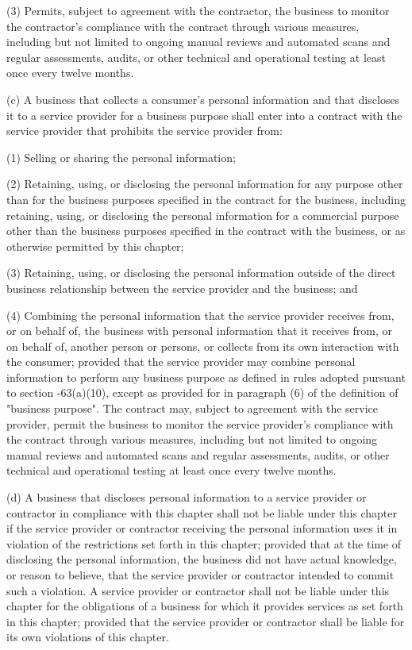      (3)  Permits, subject to agreement with the contractor, the business to monitor the contractor's compliance with the contract through various measures, including but not limited to ongoing manual reviews and automated scans and regular assessments, audits, or other technical and operational testing at least once every twelve months.

     (c)  A business that collects a consumer's personal information and that discloses it to a service provider for a business purpose shall enter into a contract with the service provider that prohibits the service provider from:

     (1)  Selling or sharing the personal information;

     (2)  Retaining, using, or disclosing the personal information for any purpose other than for the business purposes specified in the contract for the business, including retaining, using, or disclosing the personal information for a commercial purpose other than the business purposes specified in the contract with the business, or as otherwise permitted by this chapter;

     (3)  Retaining, using, or disclosing the personal information outside of the direct business relationship between the service provider and the business; and

     (4)  Combining the personal information that the service provider receives from, or on behalf of, the business with personal information that it receives from, or on behalf of, another person or persons, or collects from its own interaction with the consumer; provided that the service provider may combine personal information to perform any business purpose as defined in rules adopted pursuant to section    -63(a)(10), except as provided for in paragraph (6) of the definition of "business purpose".  The contract may, subject to agreement with the service provider, permit the business to monitor the service provider's compliance with the contract through various measures, including but not limited to ongoing manual reviews and automated scans and regular assessments, audits, or other technical and operational testing at least once every twelve months.

     (d)  A business that discloses personal information to a service provider or contractor in compliance with this chapter shall not be liable under this chapter if the service provider or contractor receiving the personal information uses it in violation of the restrictions set forth in this chapter; provided that at the time of disclosing the personal information, the business did not have actual knowledge, or reason to believe, that the service provider or contractor intended to commit such a violation.  A service provider or contractor shall not be liable under this chapter for the obligations of a business for which it provides services as set forth in this chapter; provided that the service provider or contractor shall be liable for its own violations of this chapter.

